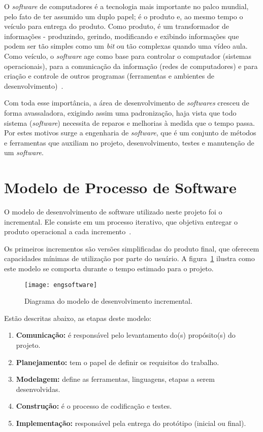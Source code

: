 	O \textit{software} de computadores é a tecnologia mais importante no palco mundial, pelo fato de ter assumido um duplo papel; é o produto e, ao mesmo tempo o veículo para entrega do produto. Como produto, é um transformador de informações - produzindo, gerindo, modificando e exibindo informações que podem ser tão simples como um \textit{bit} ou tão complexas quando uma vídeo aula. Como veículo, o \textit{software} age como base para controlar o computador (sistemas operacionais),  para a comunicação da informação (redes de computadores) e para criação e controle de outros programas (ferramentas e ambientes de desenvolvimento)~\cite{engsoftware}.

	Com toda esse importância,  a área de desenvolvimento de \textit{softwares} cresceu de forma avassaladora, exigindo assim uma padronização, haja vista que todo sistema (\textit{software}) necessita de reparos e melhorias à medida que o tempo passa. Por estes motivos surge a engenharia de \textit{software}, que é um conjunto de métodos e ferramentas que auxiliam no projeto, desenvolvimento, testes e manutenção de um \textit{software}.

\section{Modelo de Processo de Software}
	O modelo de desenvolvimento de software utilizado neste projeto foi o incremental. Ele consiste em um processo iterativo, que objetiva entregar o produto operacional a cada incremento~\cite{engsoftware}.

	Os primeiros incrementos são versões simplificadas do produto final, que oferecem capacidades mínimas de utilização por parte do usuário. A figura~\ref{fg:engsoftware} ilustra como este modelo se comporta durante o tempo estimado para o projeto.
\begin{figure}[ht!]
	\centering
	\texttt{[image: engsoftware]}
	\caption{Diagrama do modelo de desenvolvimento incremental.}
	\label{fg:engsoftware}
\end{figure} 

	Estão descritas abaixo, as etapas deste modelo:
\begin{enumerate}
	\item \textbf{Comunicação:} é responsável pelo levantamento do(s) propósito(s) do projeto.
	\item \textbf{Planejamento:} tem o papel de definir os requisitos do trabalho.
	\item \textbf{Modelagem:} define as ferramentas, linguagens, etapas a serem desenvolvidas.
	\item \textbf{Construção:} é o processo de codificação e testes.
	\item \textbf{Implementação:} responsável pela entrega do protótipo (inicial ou final).
\end{enumerate}

